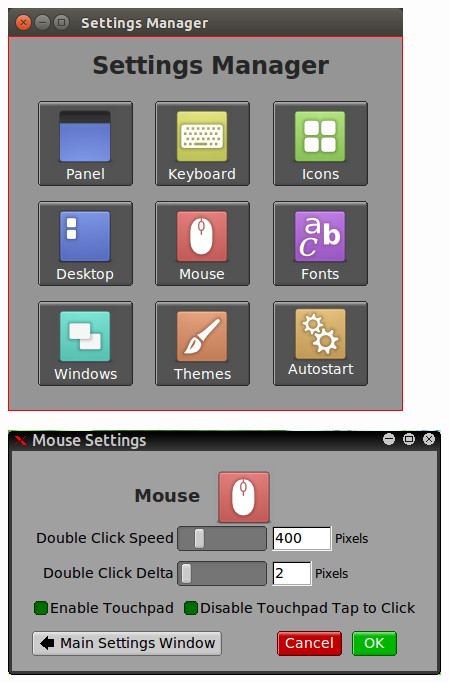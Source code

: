 \documentclass[12pt,a4paper]{book}
\begin{document}
\begin{center}
\includegraphics[width=0.7\linewidth]{jwmsettingsmanager}
\end{center}

\begin{center}
\includegraphics[width=0.7\linewidth]{mouse-settings}
\end{center}
\end{document}
